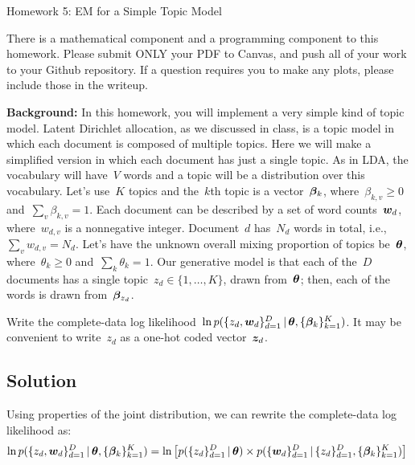 \documentclass[submit]{harvardml}
\begin{document}
\begin{center}
{\Large Homework 5: EM for a Simple Topic Model}\\
\end{center}

There is a mathematical component and a programming component to this homework.
Please submit ONLY your PDF to Canvas, and push all of your work to your Github
repository. If a question requires you to make any plots, please
include those in the writeup.

\begin{mdframed}[style=exampledefault]
\textbf{Background:} In this homework, you will implement a very simple kind of topic model.  Latent Dirichlet allocation, as we discussed in class, is a topic model in which each document is composed of multiple topics.  Here we will make a simplified version in which each document has just a single topic.  As in LDA, the vocabulary will have~$V$ words and a topic will be a distribution over this vocabulary.  Let's use~$K$ topics and the~$k$th topic is a vector~$\boldsymbol{\beta}_k$, where~${\beta_{k,v}\geq 0}$ and~${\sum_v \beta_{k,v}=1}$.  Each document can be described by a set of word counts~$\boldsymbol{w}_{d}$, where~$w_{d,v}$ is a nonnegative integer.  Document~$d$ has~$N_d$ words in total, i.e.,~${\sum_v w_{d,v}=N_d}$.  Let's have the unknown overall mixing proportion of topics be~$\boldsymbol{\theta}$, where~${\theta_k\geq 0}$ and~${\sum_k\theta_k=1}$.  Our generative model is that each of the~$D$ documents has a single topic~${z_d\in \{1,\ldots,K\}}$, drawn from~$\boldsymbol{\theta}$; then, each of the words is drawn from~$\boldsymbol{\beta}_{z_d}$.

\end{mdframed}

\begin{problem}

Write the complete-data log likelihood~$\ln p(\{z_d,\boldsymbol{w}_d\}^D_{d=1}\,|\,\boldsymbol{\theta}, \{\boldsymbol{\beta}_k\}^K_{k=1})$. It may be convenient to write~$z_d$ as a one-hot coded vector~$\boldsymbol{z}_d$.


\end{problem}
\subsection*{Solution}
Using properties of the joint distribution, we can rewrite the complete-data log likelihood as:
\[
\ln p(\{z_d,\boldsymbol{w}_d\}^D_{d=1}\,|\,\boldsymbol{\theta}, \{\boldsymbol{\beta}_k\}^K_{k=1}) = \ln \big[ p(\{z_d\}^D_{d=1} \,|\, \boldsymbol{\theta}) \times p(\{\boldsymbol{w}_d\}^D_{d=1} \,|\, \{z_d\}^D_{d=1}, \{\boldsymbol{\beta}_k\}^K_{k=1}) \big] \
\]
\end{document}
